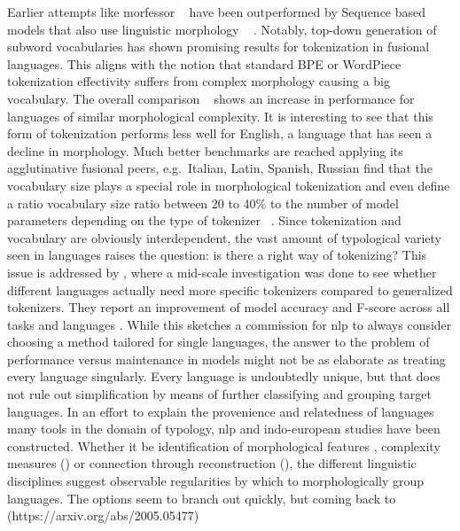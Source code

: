 Earlier attempts like morfessor ~\cite{morfessor} have been outperformed by Sequence based models that also use linguistic morphology ~\cite{subwordvsmorfessor} .
Notably, top-down generation of subword vocabularies has shown promising results for tokenization in fusional languages.
This aligns with the notion that standard BPE \cite{BPE} or WordPiece \cite{WORDPIECEGOOGLE} tokenization effectivity suffers from complex morphology causing a big vocabulary.
The overall comparison ~\cite[134]{subwordvsmorfessor} shows an increase in performance for languages of similar morphological complexity.
It is interesting to see that this form of tokenization performs less well for English, a language that has seen a decline in morphology.
Much better benchmarks are reached applying  its agglutinative fusional peers, e.g.\ Italian, Latin, Spanish, Russian
\citeauthor{TOKENIZATIONIMPACT} find that the vocabulary size plays a special role in morphological tokenization and even define a ratio vocabulary size ratio between 20 to 40\% to the number of model parameters depending on the type of tokenizer ~\cite[11--12]{TOKENIZATIONIMPACT}.
Since tokenization and vocabulary are obviously interdependent, the vast amount of typological variety seen in languages raises the question: is there a right way of tokenizing?
This issue is addressed by \citeauthor{MONOLINGUAL}, where a mid-scale investigation was done to see whether different languages actually need more specific tokenizers compared to generalized tokenizers.
They report an improvement of model accuracy and F-score across all tasks and languages \cite{MONOLINGUAL}.
While this sketches a commission for \ac{nlp} to always consider choosing a method tailored for single languages, the answer to the problem of performance versus maintenance in models might not be as elaborate as treating every language singularly.
Every language is undoubtedly unique, but that does not rule out simplification by means of further classifying and grouping target languages.
In an effort to explain the provenience and relatedness of languages many tools in the domain of typology, \ac{nlp} and indo-european studies have been constructed.
Whether it be identification of morphological features \cite[42--56]{comrie_1989}, complexity measures (\cite{measuresofMC}) or connection through reconstruction (\cite{INDOEUROPE}), the different linguistic disciplines suggest observable regularities by which to morphologically group languages.
The options seem to branch out quickly, but coming back to \cite{POLYSYNTHLM} (https://arxiv.org/abs/2005.05477)

